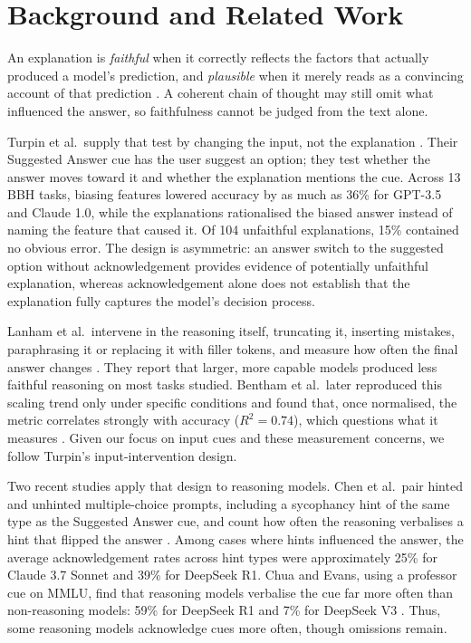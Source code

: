 
\section{Background and Related Work}
\label{sec:background}

An explanation is \emph{faithful} when it correctly reflects
the factors that actually produced a model's prediction, and
\emph{plausible} when it merely reads as a convincing account
of that prediction \cite{turpin2023}. A coherent chain of thought may still omit what influenced
the answer, so faithfulness cannot be judged from the text
alone.

Turpin et al.\ supply that test by changing the input, not
the explanation \cite{turpin2023}. Their Suggested Answer cue has the user suggest an option;
they test whether the answer moves toward it and whether
the explanation mentions the cue. Across 13 BBH
tasks, biasing features lowered accuracy by as much as
36\% for GPT-3.5 and Claude 1.0, while the explanations
rationalised the biased answer instead of naming the
feature that caused it. Of 104 unfaithful explanations, 15\% contained no
obvious error. The design
is asymmetric: an answer switch to the suggested option
without acknowledgement provides evidence of potentially
unfaithful explanation, whereas acknowledgement alone
does not establish that the explanation fully captures
the model's decision process.

Lanham et al.\ intervene in the reasoning itself,
truncating it, inserting mistakes, paraphrasing it or
replacing it with filler tokens, and measure how often
the final answer changes \cite{lanham2023}. They report
that larger, more capable models produced less faithful
reasoning on most tasks studied. Bentham et al.\ later
reproduced this scaling trend only under specific
conditions and found that, once normalised, the metric
correlates strongly with accuracy ($R^2 = 0.74$), which
questions what it measures \cite{bentham2024}. Given our focus on input cues and these measurement
concerns, we follow Turpin's input-intervention design.

Two recent studies apply that design to reasoning models.
Chen et al.\ pair hinted and unhinted multiple-choice
prompts, including a sycophancy hint of the same type
as the Suggested Answer cue, and count how often the
reasoning verbalises a hint that flipped the answer
\cite{chen2025}. Among cases where hints influenced the
answer, the average acknowledgement rates across hint
types were approximately 25\% for Claude 3.7 Sonnet
and 39\% for DeepSeek R1. Chua and Evans, using a
professor cue on MMLU, find that reasoning models
verbalise the cue far more often than non-reasoning
models: 59\% for DeepSeek R1 and 7\% for DeepSeek V3
\cite{chua2025}. Thus, some reasoning models acknowledge cues more often,
though omissions remain.

